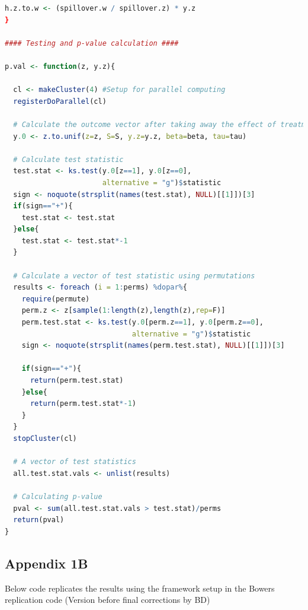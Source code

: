 \documentclass[12pt]{article}
\begin{document}
\begin{lstlisting}[language=R]
  h.z.to.w <- (spillover.w / spillover.z) * y.z
}

#### Testing and p-value calculation ####

p.val <- function(z, y.z){
  
  cl <- makeCluster(4) #Setup for parallel computing
  registerDoParallel(cl)
    
  # Calculate the outcome vector after taking away the effect of treatment
  y.0 <- z.to.unif(z=z, S=S, y.z=y.z, beta=beta, tau=tau)
  
  # Calculate test statistic
  test.stat <- ks.test(y.0[z==1], y.0[z==0],
                       alternative = "g")$statistic
  sign <- noquote(strsplit(names(test.stat), NULL)[[1]])[3]
  if(sign=="+"){
    test.stat <- test.stat
  }else{
    test.stat <- test.stat*-1
  }  
  
  # Calculate a vector of test statistic using permutations
  results <- foreach (i = 1:perms) %dopar%{
    require(permute)
    perm.z <- z[sample(1:length(z),length(z),rep=F)]
    perm.test.stat <- ks.test(y.0[perm.z==1], y.0[perm.z==0],
                              alternative = "g")$statistic
    sign <- noquote(strsplit(names(perm.test.stat), NULL)[[1]])[3]
    
    if(sign=="+"){
      return(perm.test.stat)
    }else{
      return(perm.test.stat*-1)
    }
  }
  stopCluster(cl)
  
  # A vector of test statistics
  all.test.stat.vals <- unlist(results)
  
  # Calculating p-value
  pval <- sum(all.test.stat.vals > test.stat)/perms
  return(pval)
}
\end{lstlisting}


\subsection{Appendix 1B}

Below code replicates the \citet{coppock2014information} results using the framework setup in the Bowers replication code
(Version before final corrections by BD)
\end{document}
